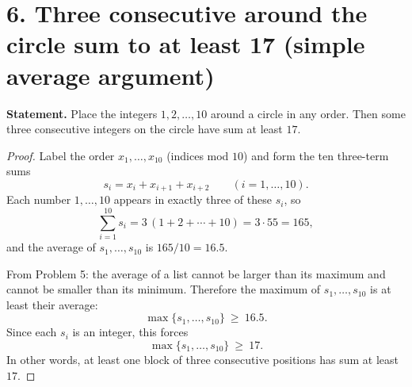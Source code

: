 \section*{6. Three consecutive around the circle sum to at least 17 (simple average argument)}

\noindent\textbf{Statement.}
Place the integers $1,2,\dots,10$ around a circle in any order. Then some three consecutive
integers on the circle have sum at least $17$.

\begin{proof}
Label the order $x_1,\dots,x_{10}$ (indices mod $10$) and form the ten three-term sums
\[
s_i = x_i+x_{i+1}+x_{i+2}\qquad(i=1,\dots,10).
\]
Each number $1,\dots,10$ appears in exactly three of these $s_i$, so
\[
\sum_{i=1}^{10} s_i = 3\,(1+2+\cdots+10)=3\cdot 55=165,
\]
and the average of $s_1,\dots,s_{10}$ is $165/10=16.5$.

From Problem 5: the average of a list cannot be larger than its maximum
and cannot be smaller than its minimum. Therefore the maximum of
$s_1,\dots,s_{10}$ is at least their average:
\[
\max\{s_1,\dots,s_{10}\}\ \ge\ 16.5.
\]
Since each $s_i$ is an integer, this forces
\[
\max\{s_1,\dots,s_{10}\}\ \ge\ 17.
\]
In other words, at least one block of three consecutive positions has sum at least $17$.

\end{proof}
